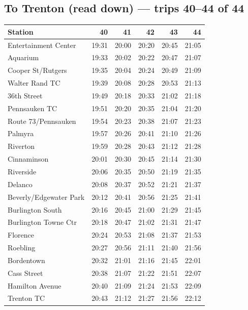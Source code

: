 \subsection*{To Trenton (read down) --- trips 40--44 of 44}
\begin{center}\footnotesize\setlength{\tabcolsep}{3pt}\begin{tabular}{@{}lrrrrr@{}}\toprule
Station & 40 & 41 & 42 & 43 & 44 \\\midrule
Entertainment Center & 19:31 & 20:00 & 20:20 & 20:45 & 21:05 \\
Aquarium & 19:33 & 20:02 & 20:22 & 20:47 & 21:07 \\
Cooper St/Rutgers & 19:35 & 20:04 & 20:24 & 20:49 & 21:09 \\
Walter Rand TC & 19:39 & 20:08 & 20:28 & 20:53 & 21:13 \\
36th Street & 19:49 & 20:18 & 20:33 & 21:02 & 21:18 \\
Pennsauken TC & 19:51 & 20:20 & 20:35 & 21:04 & 21:20 \\
Route 73/Pennsauken & 19:54 & 20:23 & 20:38 & 21:07 & 21:23 \\
Palmyra & 19:57 & 20:26 & 20:41 & 21:10 & 21:26 \\
Riverton & 19:59 & 20:28 & 20:43 & 21:12 & 21:28 \\
Cinnaminson & 20:01 & 20:30 & 20:45 & 21:14 & 21:30 \\
Riverside & 20:06 & 20:35 & 20:50 & 21:19 & 21:35 \\
Delanco & 20:08 & 20:37 & 20:52 & 21:21 & 21:37 \\
Beverly/Edgewater Park & 20:12 & 20:41 & 20:56 & 21:25 & 21:41 \\
Burlington South & 20:16 & 20:45 & 21:00 & 21:29 & 21:45 \\
Burlington Towne Ctr & 20:18 & 20:47 & 21:02 & 21:31 & 21:47 \\
Florence & 20:24 & 20:53 & 21:08 & 21:37 & 21:53 \\
Roebling & 20:27 & 20:56 & 21:11 & 21:40 & 21:56 \\
Bordentown & 20:32 & 21:01 & 21:16 & 21:45 & 22:01 \\
Cass Street & 20:38 & 21:07 & 21:22 & 21:51 & 22:07 \\
Hamilton Avenue & 20:40 & 21:09 & 21:24 & 21:53 & 22:09 \\
Trenton TC & 20:43 & 21:12 & 21:27 & 21:56 & 22:12 \\
\bottomrule\end{tabular}\end{center}
